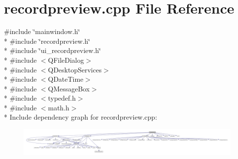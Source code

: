 \hypertarget{a00042}{\section{recordpreview.\+cpp File Reference}
\label{a00042}
}
{\ttfamily \#include \char`\"{}mainwindow.\+h\char`\"{}}\\*
{\ttfamily \#include \char`\"{}recordpreview.\+h\char`\"{}}\\*
{\ttfamily \#include \char`\"{}ui\+\_\+recordpreview.\+h\char`\"{}}\\*
{\ttfamily \#include $<$Q\+File\+Dialog$>$}\\*
{\ttfamily \#include $<$Q\+Desktop\+Services$>$}\\*
{\ttfamily \#include $<$Q\+Date\+Time$>$}\\*
{\ttfamily \#include $<$Q\+Message\+Box$>$}\\*
{\ttfamily \#include $<$typedef.\+h$>$}\\*
{\ttfamily \#include $<$math.\+h$>$}\\*
Include dependency graph for recordpreview.\+cpp\+:
\nopagebreak
\begin{figure}[H]
\begin{center}
\leavevmode
\includegraphics[width=350pt]{d7/ded/a00196}
\end{center}
\end{figure}
